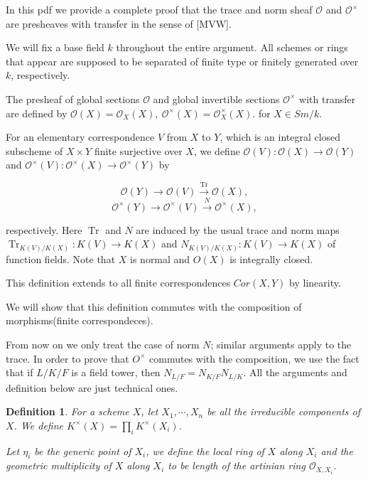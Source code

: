 \documentclass{article}
\theoremstyle{theorem}
\newtheorem*{definition*}{Definition}
\theoremstyle{definition}
\begin{document}
    In this pdf we provide a complete proof that the trace and norm sheaf $\mathcal O$ and $\mathcal O^\times$ are presheaves with transfer in the sense of [MVW].
    
    We will fix a base field $k$ throughout the entire argument. All schemes or rings that appear are supposed to be separated of finite type or finitely generated over $k$, respectively.\newline
    
    
    The presheaf of global sections $\mathcal O$ and global invertible sections $\mathcal O^\times$ with transfer are defined by $\mathcal O(X) = \mathcal O_X(X), \ \mathcal O^\times(X) = \mathcal O_X^\times(X).$ for $X \in Sm/k$.
    
    For an elementary correspondence $V$ from $X$ to $Y$, which is an integral closed subscheme of $X \times Y$ finite surjective over $X$, we define $\mathcal O(V) : \mathcal O(X) \rightarrow \mathcal O(Y)$ and $\mathcal O^\times(V) : \mathcal O^\times(X) \rightarrow \mathcal O^\times(Y)$ by
    
    $$\mathcal O(Y) \rightarrow \mathcal O(V) \xrightarrow{\operatorname{Tr}} \mathcal O(X),$$
    $$\mathcal O^\times(Y) \rightarrow \mathcal O^\times(V) \xrightarrow{N} \mathcal O^\times(X),$$
    
    respectively. Here $\operatorname{Tr}$ and $N$ are induced by the usual trace and norm maps $\operatorname{Tr}_{K(V)/K(X)} : K(V) \rightarrow K(X)$ and $N_{K(V)/K(X)} : K(V) \rightarrow K(X)$ of function fields. Note that $X$ is normal and $O(X)$ is integrally closed.
    
    This definition extends to all finite correspondences $Cor(X, Y)$ by linearity.
    
    We will show that this definition commutes with the composition of morphisms(finite correspondeces).\newline
    
    
    From now on we only treat the case of norm $N$; similar arguments apply to the trace.
    In order to prove that $O^\times$ commutes with the composition, we use the fact that if $L/K/F$ is a field tower, then $N_{L/F} = N_{K/F}N_{L/K}$. All the arguments and definition below are just technical ones.\newline
    
    \begin{definition*}
        For a scheme $X$, let $X_1, \cdots, X_n$ be all the irreducible components of $X$. We define $K^\times(X) = \displaystyle \prod_{i} K^\times(X_i).$
        
        Let $\eta_i$ be the generic point of $X_i$, we define the local ring of $X$ along $X_i$ and the geometric multiplicity of $X$ along $X_i$ to be length of the artinian ring $\mathcal O_{X, X_i}$.
    \end{definition*}
    
\end{document}
